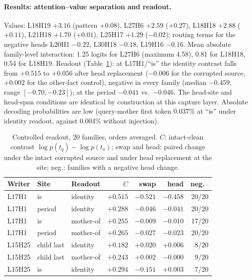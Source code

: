 \paragraph{Results: attention--value separation and readout.}
Values: L18H19 $+3.16$ (pattern $+0.08$), L27H6 $+2.59$ ($+0.27$), L18H18 $+2.88$
($+0.11$), L21H18 $+1.70$ ($+0.01$), L25H17 $+1.29$ ($-0.02$); routing terms for the
negative heads L20H1 $-0.22$, L30H18 $-0.18$, L19H16 $-0.16$. Mean absolute
family-level interaction: 1.25 logits for L27H6 (maximum 4.58), 0.81 for L18H18, 0.54
for L18H19. Readout (Table~\ref{tab:readout-app}): at L17H1/``is'' the identity
contrast falls from $+0.515$ to $+0.056$ after head replacement ($-0.006$ for the
corrupted source, $+0.002$ for the other-fact control), negative in every family
(median $-0.459$, range $[-0.70,-0.23]$); at the period $-0.041$ vs.\ $-0.046$. The
head-site and head-span conditions are identical by construction at this capture
layer. Absolute decoding probabilities are low (query-mother first token 0.037\% at
``is'' under identity readout, against 0.004\% without injection).

\begin{table}[h]
\centering\scriptsize
\setlength{\tabcolsep}{2.5pt}
\begin{tabular}{@{}lllrrrr@{}}
\toprule
Writer & Site & Readout & $C$ & swap & head & neg.\ \\
\midrule
L17H1 & is & identity & $+0.515$ & $-0.521$ & $-0.458$ & 20/20 \\
L17H1 & period & identity & $+0.288$ & $-0.046$ & $-0.041$ & 20/20 \\
L17H1 & is & mother-of & $+0.255$ & $-0.009$ & $-0.010$ & 17/20 \\
L17H1 & period & mother-of & $+0.265$ & $-0.027$ & $-0.023$ & 20/20 \\
L15H25 & child last & identity & $+0.182$ & $+0.020$ & $+0.006$ & 8/20 \\
L15H25 & child last & mother-of & $+0.243$ & $+0.002$ & $-0.000$ & 9/20 \\
L15H25 & is & identity & $+0.294$ & $-0.151$ & $+0.003$ & 7/20 \\
\bottomrule
\end{tabular}
\caption{Controlled readout, 20 families, orders averaged. $C$: intact-clean contrast
$\log p(t_q)-\log p(t_o)$; swap and head: paired change under the intact corrupted
source and under head replacement at the site; neg.: families with a negative head
change.}
\label{tab:readout-app}
\end{table}

